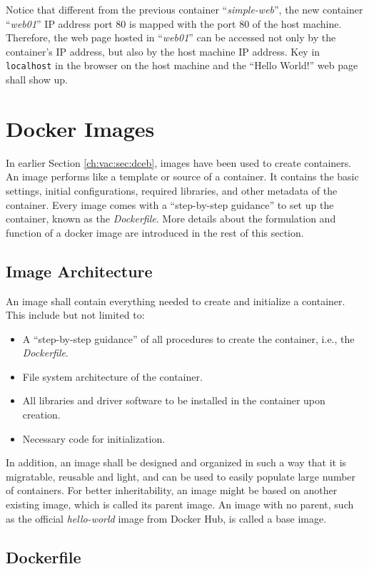 Notice that different from the previous container ``\textit{simple-web}'', the new container ``\textit{web01}'' IP address port 80 is mapped with the port 80 of the host machine. Therefore, the web page hosted in ``\textit{web01}'' can be accessed not only by the container's IP address, but also by the host machine IP address. Key in \verb|localhost| in the browser on the host machine and the ``Hello World!'' web page shall show up.

\section{Docker Images}

In earlier Section \ref{ch:vac:sec:dceb}, images have been used to create containers. An image performs like a template or source of a container. It contains the basic settings, initial configurations, required libraries, and other metadata of the container. Every image comes with a ``step-by-step guidance'' to set up the container, known as the \textit{Dockerfile}. More details about the formulation and function of a docker image are introduced in the rest of this section.

\subsection{Image Architecture}

An image shall contain everything needed to create and initialize a container. This include but not limited to:
\begin{itemize}
  \item A ``step-by-step guidance'' of all procedures to create the container, i.e., the \textit{Dockerfile}.
  \item File system architecture of the container.
  \item All libraries and driver software to be installed in the container upon creation.
  \item Necessary code for initialization.
\end{itemize}
In addition, an image shall be designed and organized in such a way that it is migratable, reusable and light, and can be used to easily populate large number of containers. For better inheritability, an image might be based on another existing image, which is called its parent image. An image with no parent, such as the official \textit{hello-world} image from Docker Hub, is called a base image.

\subsection{Dockerfile}


